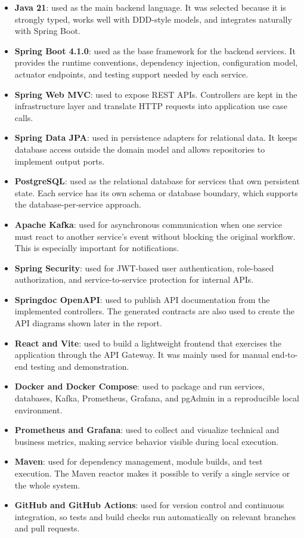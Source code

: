 \documentclass[12pt,a4paper]{article}
\begin{document}
\begin{itemize}
    \item \textbf{Java 21}: used as the main backend language. It was selected because it is strongly typed, works well with DDD-style models, and integrates naturally with Spring Boot.
    \item \textbf{Spring Boot 4.1.0}: used as the base framework for the backend services. It provides the runtime conventions, dependency injection, configuration model, actuator endpoints, and testing support needed by each service.
    \item \textbf{Spring Web MVC}: used to expose REST APIs. Controllers are kept in the infrastructure layer and translate HTTP requests into application use case calls.
    \item \textbf{Spring Data JPA}: used in persistence adapters for relational data. It keeps database access outside the domain model and allows repositories to implement output ports.
    \item \textbf{PostgreSQL}: used as the relational database for services that own persistent state. Each service has its own schema or database boundary, which supports the database-per-service approach.
    \item \textbf{Apache Kafka}: used for asynchronous communication when one service must react to another service's event without blocking the original workflow. This is especially important for notifications.
    \item \textbf{Spring Security}: used for JWT-based user authentication, role-based authorization, and service-to-service protection for internal APIs.
    \item \textbf{Springdoc OpenAPI}: used to publish API documentation from the implemented controllers. The generated contracts are also used to create the API diagrams shown later in the report.
    \item \textbf{React and Vite}: used to build a lightweight frontend that exercises the application through the API Gateway. It was mainly used for manual end-to-end testing and demonstration.
    \item \textbf{Docker and Docker Compose}: used to package and run services, databases, Kafka, Prometheus, Grafana, and pgAdmin in a reproducible local environment.
    \item \textbf{Prometheus and Grafana}: used to collect and visualize technical and business metrics, making service behavior visible during local execution.
    \item \textbf{Maven}: used for dependency management, module builds, and test execution. The Maven reactor makes it possible to verify a single service or the whole system.
    \item \textbf{GitHub and GitHub Actions}: used for version control and continuous integration, so tests and build checks run automatically on relevant branches and pull requests.
\end{itemize}
\end{document}
